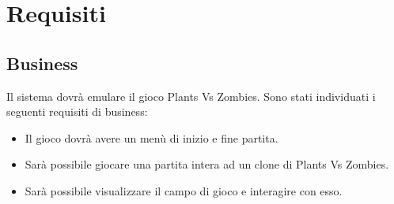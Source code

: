 \newpage
\section{Requisiti}
\subsection{Business}
Il sistema dovrà emulare il gioco Plants Vs Zombies.
Sono stati individuati i seguenti requisiti di business:
\begin{itemize}
    \item Il gioco dovrà avere un menù di inizio e fine partita.
    \item Sarà possibile giocare una partita intera ad un clone di Plants Vs Zombies.
    \item Sarà possibile visualizzare il campo di gioco e interagire con esso.
\end{itemize}

